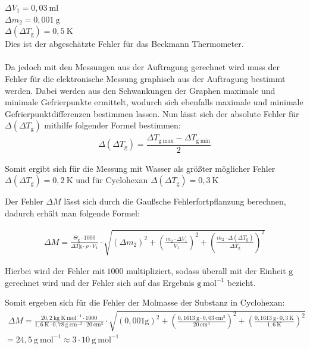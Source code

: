 \documentclass[12pt,a4paper,titlepage,headinclude,bibtotoc]{scrartcl}
\begin{document}
$\Delta V_1 = 0,03{~}\mathrm{ml}  $\\
$\Delta m_2 = 0,001{~}\mathrm{g}  $\\
$\Delta (\Delta T_\mathrm{g}) = 0,5{~}\text{K}  $\\ Dies ist der abgeschätzte Fehler für das Beckmann Thermometer.\\\\
Da jedoch mit den Messungen aus der Auftragung gerechnet wird muss der Fehler für die elektronische Messung graphisch aus der Auftragung bestimmt werden. Dabei werden aus den Schwankungen der Graphen maximale und minimale Gefrierpunkte ermittelt, wodurch sich ebenfalls maximale und minimale Gefrierpunktdifferenzen bestimmen lassen. Nun lässt sich der absolute Fehler für $\Delta (\Delta T_\mathrm{g})$ mithilfe folgender Formel bestimmen:
\begin{align}
\Delta (\Delta T_\mathrm{g}) = \dfrac{ \Delta T_{\mathrm{g {~}max}} -\Delta T_{\mathrm{g{~}{min}}}}{2}
\end{align}

Somit ergibt sich für die Messung mit Wasser als größter möglicher Fehler $\Delta (\Delta T_\mathrm{g}) = 0,2{~\mathrm{K}}$  und für Cyclohexan $\Delta (\Delta T_\mathrm{g}) = 0,3{~\mathrm{K}}$

Der Fehler $\Delta M$ lässt sich durch die Gaußsche Fehlerfortpflanzung berechnen, dadurch erhält man folgende Formel:

\begin{align}
\Delta M = \frac{ \mathit{\Theta}_\mathrm{g} \cdot 1000}{\Delta T\mathrm{g} \cdot \rho \cdot V_1} \cdot  \sqrt{\left(\Delta m_2\right)^2 + \left( \frac{m_2 \cdot \Delta V_1}{V_1}\right)^2 + \left( \frac{ m_2 \cdot \Delta (\Delta T_{\mathrm{g}})}{\Delta T_{\mathrm{g}}} \right)^2 }
\end{align}

Hierbei wird der Fehler $\mathrm{mit {~}1000}$ multipliziert, sodass überall mit der Einheit $\mathrm{g}$ gerechnet wird und der Fehler sich auf das Ergebnis $\mathrm{g{~} mol^{-1}}$ bezieht.

Somit ergeben sich für die Fehler der Molmasse der Substanz in Cyclohexan:\\
\begin{align}
\Delta M = \frac{ 20,2 {~}\mathrm{kg {~} K {~} mol^{-1}} \cdot 1000}{1,6 {~} \mathrm{K} \cdot 0,78{~} \mathrm{g {~}cm^{-3}} \cdot 20{~} \mathrm{cm^{3}}} \cdot  \sqrt{\left(0,001 \mathrm{g}\right)^2 + \left( \frac{0,1613 {~} \mathrm{g} \cdot 0,03{~} \mathrm{cm^{3}}}{20{~} \mathrm{cm^{3}}}\right)^2 + \left( \frac{ 0,1613 {~} \mathrm{g} \cdot 0,3{~} \text{K}}{1,6 {~} \mathrm{K}} \right)^2 }
\end{align}
$= 24,5{~}\mathrm{g{~}mol^{-1}} \approx 3 \cdot 10{~}\mathrm{g{~}mol^{-1}} $
\end{document}
